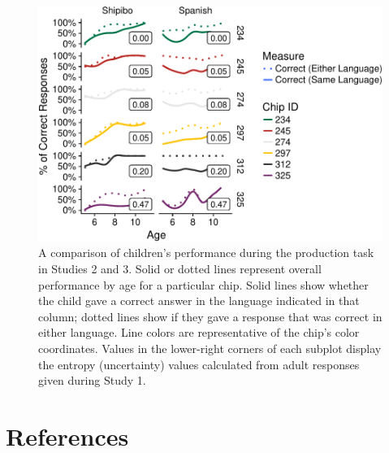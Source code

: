 \documentclass[man]{apa6}
\theoremstyle{definition}
\theoremstyle{definition}
\theoremstyle{definition}
\theoremstyle{remark}
\begin{document}
\begin{figure}
\centering
\includegraphics{amazon_color_files/figure-latex/childfigure-1.pdf}
\caption{\label{fig:childfigure}A comparison of children's performance
during the production task in Studies 2 and 3. Solid or dotted lines
represent overall performance by age for a particular chip. Solid lines
show whether the child gave a correct answer in the language indicated
in that column; dotted lines show if they gave a response that was
correct in either language. Line colors are representative of the chip's
color coordinates. Values in the lower-right corners of each subplot
display the entropy (uncertainty) values calculated from adult responses
given during Study 1.}
\end{figure}

\newpage

\section{References}\label{references}

\begingroup
\setlength{\parindent}{-0.5in} \setlength{\leftskip}{0.5in}

\hypertarget{refs}{}

\endgroup
\end{document}
